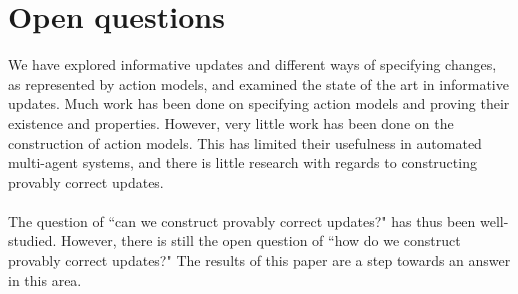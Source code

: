 \section{Open questions} \label{section:literatureReview:openQuestions}

We have explored informative updates and different ways of specifying changes, as represented by action models, and examined the state of the
art in informative updates.
Much work has been done on specifying action models and proving their existence and properties.
However, very little work has been done on the construction of action models.
This has limited their usefulness in automated multi-agent systems, and there is little research
with regards to constructing provably correct updates.\\
\\
The question of ``can we construct provably correct updates?" has thus been well-studied.
However, there is still the open question of ``how do we construct provably correct updates?"
The results of this paper are a step towards an answer in this area.
